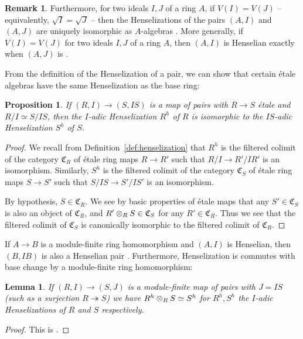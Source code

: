 \documentclass[12pt]{article}
\newcommand{\mf}[1]{\mathfrak{#1}}
\newcommand{\Et}{\'etale\xspace}
\newcommand{\spcite}[2]{\cite[\href{https://stacks.math.columbia.edu/tag/#1}{{#2} {#1}}]{stackp}}
\newtheorem{proposition}[theorem]{Proposition}
\newtheorem{lemma}[theorem]{Lemma}
\theoremstyle{definition}
\newtheorem{remark}[theorem]{Remark}
\numberwithin{equation}{subsection}
\begin{document}
\begin{remark}\label{rmk:radideal}
Furthermore, for two ideals $I,J$ of a ring $A$, if $V(I)=V(J)$ -- equivalently, $\sqrt{I}=\sqrt{J}$ -- then the Henselizations of the pairs $(A,I)$ and $(A,J)$ are uniquely isomorphic as $A$-algebras \spcite{0F0L}{Lemma}. More generally, if $V(I)=V(J)$ for two ideals $I,J$ of a ring $A$, then $(A,I)$ is Henselian exactly when $(A,J)$ is \spcite{09XJ}{Lemma}.\end{remark}

From the definition of the Henselization of a pair, we can show that certain \Et algebras have the same Henselization as the base ring:

\begin{proposition}\label{prop:hensetexp} If $(R,I) \to (S,IS)$ is a map of pairs with $R \to S$ \Et and $R/I \simeq S/IS$, then the $I$-adic Henselization $R^h$ of $R$ is isomorphic to the $IS$-adic Henselization $S^h$ of $S$.
\end{proposition}
\begin{proof} 

We recall from Definition~\ref{def:henselization} that $R^h$ is the filtered colimit of the category $\mf{C}_R$ of \Et ring maps $R \to R'$ such that $R/I \to R'/IR'$ is an isomorphism. Similarly, $S^h$ is the filtered colimit of the category $\mf{C}_S$ of \Et ring maps $S \to S'$ such that $S/IS \to S'/IS'$ is an isomorphism. 

By hypothesis, $S \in \mf{C}_R$. We see by basic properties of \Et maps that any $S' \in \mf{C}_S$ is also an object of $\mf{C}_R$, and $R' \tens_R S \in \mf{C}_S$ for any $R' \in \mf{C}_R$. Thus we see that the filtered colimit of $\mf{C}_S$ is canonically isomorphic to the filtered colimit of $\mf{C}_R$.\end{proof}



If $A \to B$ is a module-finite ring homomorphism and $(A,I)$ is Henselian, then $(B,IB)$ is also a Henselian pair \spcite{09XK}{Lemma}. Furthermore, Henselization is commutes with base change by a module-finite ring homomorphism:

\begin{lemma}\label{lem:hensmodfin}If $(R,I) \to (S,J)$ is a module-finite map of pairs with $J=IS$ (such as a surjection $R \twoheadrightarrow S$) we have $R^h \tens_R S \simeq S^h$ for $R^h,S^h$ the $I$-adic  Henselizations of $R$ and $S$ respectively.
\end{lemma}
\begin{proof} This is \spcite{0DYE}{Lemma}. \end{proof}
\end{document}
